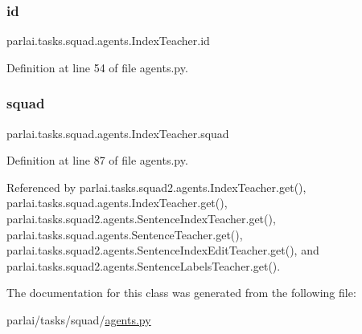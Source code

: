 \subsubsection{\texorpdfstring{id}{id}}
{\footnotesize\ttfamily parlai.\+tasks.\+squad.\+agents.\+Index\+Teacher.\+id}



Definition at line 54 of file agents.\+py.

\mbox{\label{classparlai_1_1tasks_1_1squad_1_1agents_1_1IndexTeacher_a419cb93430d8865d83f4968daf3b77d1}} 
\subsubsection{\texorpdfstring{squad}{squad}}
{\footnotesize\ttfamily parlai.\+tasks.\+squad.\+agents.\+Index\+Teacher.\+squad}



Definition at line 87 of file agents.\+py.



Referenced by parlai.\+tasks.\+squad2.\+agents.\+Index\+Teacher.\+get(), parlai.\+tasks.\+squad.\+agents.\+Index\+Teacher.\+get(), parlai.\+tasks.\+squad2.\+agents.\+Sentence\+Index\+Teacher.\+get(), parlai.\+tasks.\+squad.\+agents.\+Sentence\+Teacher.\+get(), parlai.\+tasks.\+squad2.\+agents.\+Sentence\+Index\+Edit\+Teacher.\+get(), and parlai.\+tasks.\+squad2.\+agents.\+Sentence\+Labels\+Teacher.\+get().



The documentation for this class was generated from the following file\+:\begin{DoxyCompactItemize}
\item 
parlai/tasks/squad/\hyperlink{parlai_2tasks_2squad_2agents_8py}{agents.\+py}\end{DoxyCompactItemize}
